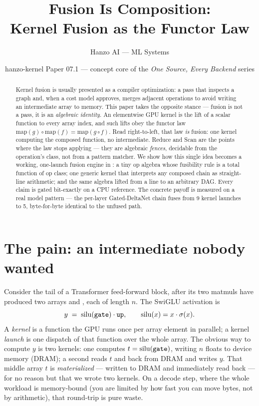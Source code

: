 \documentclass[11pt]{article}
\title{\textbf{Fusion Is Composition:\\ Kernel Fusion as the Functor Law}}
\author{Hanzo AI --- ML Systems}
\date{hanzo-kernel Paper 07.1 --- concept core of the \emph{One Source, Every Backend} series}
\begin{document}
\maketitle

\begin{abstract}
Kernel fusion is usually presented as a compiler optimization: a pass that inspects a graph and, when
a cost model approves, merges adjacent operations to avoid writing an intermediate array to memory. This
paper takes the opposite stance --- fusion is not a pass, it is an \emph{algebraic identity}. An
elementwise GPU kernel is the lift of a scalar function to every array index, and such lifts obey the
functor law $\mathrm{map}(g)\circ\mathrm{map}(f)=\mathrm{map}(g\circ f)$. Read right-to-left, that law
\emph{is} fusion: one kernel computing the composed function, no intermediate. Reduce and Scan are the
points where the law stops applying --- they are algebraic \emph{fences}, decidable from the operation's
class, not from a pattern matcher. We show how this single idea becomes a working, one-launch fusion
engine in \hk{}: a tiny op algebra whose fusibility rule is a total function of op class; one generic
kernel that interprets any composed chain as straight-line arithmetic; and the same algebra lifted from a
line to an arbitrary DAG. Every claim is gated bit-exactly on a CPU reference. The concrete payoff is
measured on a real model pattern --- the per-layer Gated-DeltaNet chain fuses from 9 kernel launches to
5, byte-for-byte identical to the unfused path.
\end{abstract}

\section{The pain: an intermediate nobody wanted}
\label{sec:pain}

Consider the tail of a Transformer feed-forward block, after its two matmuls have produced two arrays
 and , each of length $n$. The SwiGLU activation is
\[
y \;=\; \mathrm{silu}(\texttt{gate}) \cdot \texttt{up}, \qquad \mathrm{silu}(x)=x\cdot\sigma(x).
\]
A \emph{kernel} is a function the GPU runs once per array element in parallel; a kernel \emph{launch} is
one dispatch of that function over the whole array. The obvious way to compute $y$ is two kernels: one
computes $t=\mathrm{silu}(\texttt{gate})$, writing $n$ floats to device memory (DRAM); a second reads $t$
and  back from DRAM and writes $y$. That middle array $t$ is \emph{materialized} --- written to
DRAM and immediately read back --- for no reason but that we wrote two kernels. On a decode step, where
the whole workload is memory-bound (you are limited by how fast you can move bytes, not by arithmetic),
that round-trip is pure waste.
\end{document}
